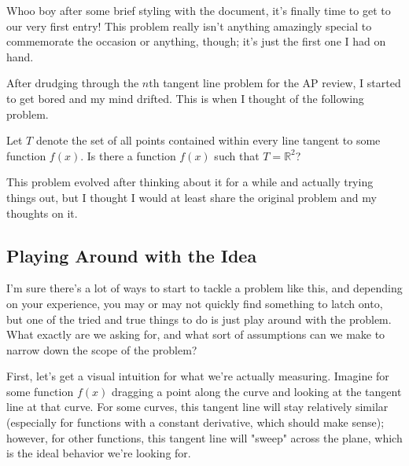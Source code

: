 Whoo boy after some brief styling with the document, it's finally time to get
to our very first entry! This problem really isn't anything amazingly special
to commemorate the occasion or anything, though; it's just the first one I had
on hand.

After drudging through the \( n \)th tangent line problem for the AP review, I
 started to get bored and my mind drifted. This is when I
thought of the following problem.

\begin{blackbox}
    \begin{problem}
        Let \( T \) denote the set of all points contained within every line
        tangent to some function \( f \left( x \right) \). Is there a function
        \( f \left( x \right) \) such that \( T = \mathbb{R}^2 \)?
    \end{problem}
\end{blackbox}

This problem evolved after thinking about it for a while and actually trying
things out, but I thought I would at least share the original problem and my
thoughts on it.

\subsection{Playing Around with the Idea}

I'm sure there's a lot of ways to start to tackle a problem like this, and
depending on your experience, you may or may not quickly find something to
latch onto, but one of the tried and true things to do is just play around with
the problem. What exactly are we asking for, and what sort of assumptions can
we make to narrow down the scope of the problem?

\begin{figure}[ht]
    \centering
    
\end{figure}

First, let's get a visual intuition for what we're actually measuring. Imagine
for some function \( f \left( x \right) \) dragging a point along the curve and
looking at the tangent line at that curve. For some curves, this tangent line
will stay relatively similar (especially for functions with a constant
derivative, which should make sense); however, for other functions, this
tangent line will "sweep" across the plane, which is the ideal behavior we're
looking for.

